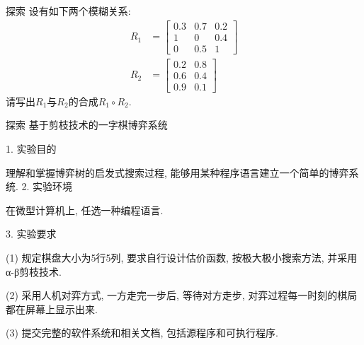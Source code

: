\begin{custom}[explorecolor]{探索}
设有如下两个模糊关系:
\begin{align*}
R_{1}&=\left[\begin{array}{ccc}{0.3} & {0.7} & {0.2} \\ {1} & {0} & {0.4} \\ {0} & {0.5} & {1}\end{array}\right]\\
R_{2}&=\left[\begin{array}{cc}{0.2} & {0.8} \\ {0.6} & {0.4} \\ {0.9} & {0.1}\end{array}\right]
\end{align*}请写出$R_1$与$R_2$的合成$R_1\circ R_2$.
\end{custom}
\begin{custom}[explorecolor]{探索}
基于剪枝技术的一字棋博弈系统

    1. 实验目的

    理解和掌握博弈树的启发式搜索过程, 能够用某种程序语言建立一个简单的博弈系统.
    2. 实验环境

在微型计算机上, 任选一种编程语言.

    3. 实验要求

    (1) 规定棋盘大小为5行5列, 要求自行设计估价函数, 按极大极小搜索方法, 并采用α-β剪枝技术.

    (2) 采用人机对弈方式, 一方走完一步后, 等待对方走步, 对弈过程每一时刻的棋局都在屏幕上显示出来.

    (3) 提交完整的软件系统和相关文档, 包括源程序和可执行程序.
\end{custom}

